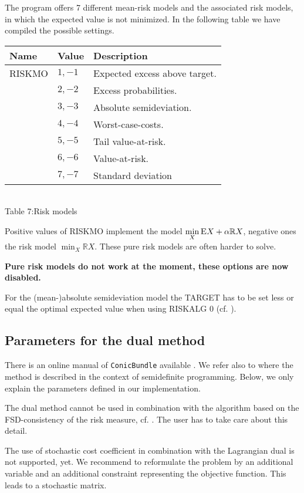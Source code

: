 \documentclass[11pt,draft]{article}
\newcommand{\expect}{{\textsc{E}}} %
\newcommand{\E}{{\expect}} %
\newcommand{\+}{{\ti{+}}}
\newcommand{\1}{{\ti{1}}}
\newcommand{\R}{\mathbb{R}}
\begin{document}
The program offers 7 different mean-risk models and the associated risk models, in which the expected
value is not minimized. In the following table we have compiled the possible settings.
%
\begin{center}
\begin{tabular}{|lll|} 
\hline
Name&Value&Description\\ \hline
RISKMO&$1,-1$&Expected excess above target.\\[0.2em]
&$2,-2$&Excess probabilities.\\[0.2em]
&$3,-3$&Absolute semideviation.\\[0.2em]
&$4,-4$&Worst-case-costs.\\[0.2em]
&$5,-5$&Tail value-at-risk.\\[0.2em]
&$6,-6$&Value-at-risk.\\[0.2em]
&$7,-7$&Standard deviation\\
\hline
\end{tabular}
\\[0.5em]{Table 7:\quad Risk models}
\end{center} %

Positive values of RISKMO implement the model $\min_X \limits \E X + \alpha \R X$, negative ones
the risk model $\min_X \limits \R X$. These pure risk models are often harder to solve.

{\bf Pure risk models do not work at the moment, these options are now disabled.} 

For the (mean-)absolute semideviation model the TARGET has to be set less or equal the optimal expected value when using RISKALG 0 (cf. \cite{diss}).
%
\subsection{Parameters for the dual method} \label{SS:DUAL}
There is an online manual of \texttt{ConicBundle} available \cite{CB}. We refer also
to \cite{helm2} where the method is described in the context of semidefinite programming.
Below, we only explain the parameters defined in our implementation.

The dual method cannot be used in combination with the algorithm based on the FSD-consistency of the
risk measure, cf. \cite{diss}. The user has to take care about this detail. 

The use of stochastic cost coefficient in combination with the Lagrangian dual is not supported,
yet. We recommend to reformulate the problem by an additional variable and an additional constraint
representing the objective function. This leads to a stochastic matrix. 
\end{document}
